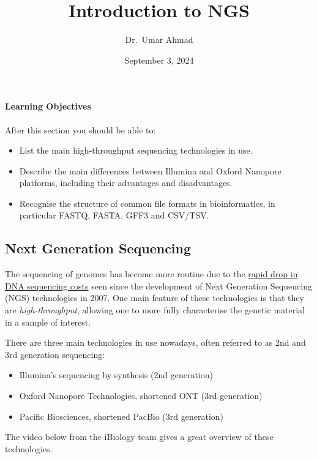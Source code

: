 \documentclass[
]{article}
\title{Introduction to NGS}
\author{Dr.~Umar Ahmad}
\date{September 3, 2024}
\providecommand{\tightlist}{%
  \setlength{\itemsep}{0pt}\setlength{\parskip}{0pt}}
\begin{document}
\maketitle

\paragraph{Learning Objectives}\label{learning-objectives}

After this section you should be able to:

\begin{itemize}
\tightlist
\item
  List the main high-throughput sequencing technologies in use.
\item
  Describe the main differences between Illumina and Oxford Nanopore
  platforms, including their advantages and disadvantages.
\item
  Recognise the structure of common file formats in bioinformatics, in
  particular FASTQ, FASTA, GFF3 and CSV/TSV.
\end{itemize}

\subsection{Next Generation
Sequencing}\label{next-generation-sequencing}

The sequencing of genomes has become more routine due to the
\href{https://www.genome.gov/about-genomics/fact-sheets/DNA-Sequencing-Costs-Data}{rapid
drop in DNA sequencing costs} seen since the development of Next
Generation Sequencing (NGS) technologies in 2007. One main feature of
these technologies is that they are \emph{high-throughput}, allowing one
to more fully characterise the genetic material in a sample of interest.

There are three main technologies in use nowadays, often referred to as
2nd and 3rd generation sequencing:

\begin{itemize}
\tightlist
\item
  Illumina's sequencing by synthesis (2nd generation)
\item
  Oxford Nanopore Technologies, shortened ONT (3rd generation)
\item
  Pacific Biosciences, shortened PacBio (3rd generation)
\end{itemize}

The video below from the iBiology team gives a great overview of these
technologies.
\end{document}
